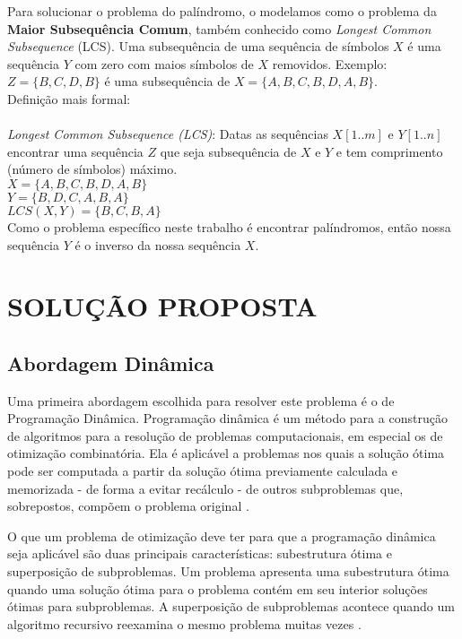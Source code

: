 \documentclass[12pt]{article}
\begin{document}
	Para solucionar o problema do palíndromo, o modelamos como o problema da \textbf{Maior Subsequência Comum}, também conhecido como \textit{Longest Common Subsequence} (LCS). Uma subsequência de uma sequência de símbolos $X$ é uma sequência $Y$ com zero com maios símbolos de $X$ removidos. Exemplo: $Z = \{B, C, D, B\}$ é uma subsequência de $X = \{A, B, C, B, D, A, B\}$.
	\\
	Definição mais formal:\\
	\\
	\textit{Longest Common Subsequence (LCS)}: Datas as sequências $X [1..m]$ e $Y [1..n]$ encontrar uma sequência $Z$ que seja subsequência de $X$ e $Y$ e tem comprimento (número de símbolos) máximo.\\
	$X = \{A, B, C, B, D, A, B\}$\\
	$Y = \{B, D, C, A, B, A\}$\\
	$LCS (X,Y) = \{B, C, B, A\}$\\

	Como o problema específico neste trabalho é encontrar palíndromos, então nossa sequência $Y$ é o inverso da nossa sequência $X$.

\section{SOLUÇÃO PROPOSTA}
\label{solucao_proposta}

\subsection{Abordagem Dinâmica}
\label{dinamica}

    Uma primeira abordagem escolhida para resolver este problema é o de Programação Dinâmica. Programação dinâmica é um método para a construção de algoritmos para a resolução de problemas computacionais, em especial os de otimização combinatória. Ela é aplicável a problemas nos quais a solução ótima pode ser computada a partir da solução ótima previamente calculada e memorizada - de forma a evitar recálculo - de outros subproblemas que, sobrepostos, compõem o problema original \cite{szwarccfiter}.

    O que um problema de otimização deve ter para que a programação dinâmica seja aplicável são duas principais características: subestrutura ótima e superposição de subproblemas. Um problema apresenta uma subestrutura ótima quando uma solução ótima para o problema contém em seu interior soluções ótimas para subproblemas. A superposição de subproblemas acontece quando um algoritmo recursivo reexamina o mesmo problema muitas vezes \cite{szwarccfiter}.
\end{document}
